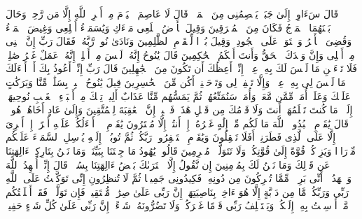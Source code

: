 \stopbuffer
\startbuffer[\q:11:43]
قَالَ سَءَاوِیۤ إِلَىٰ جَبَلࣲ یَعۡصِمُنِی مِنَ ٱلۡمَاۤءِۚ قَالَ لَا عَاصِمَ ٱلۡیَوۡمَ مِنۡ أَمۡرِ ٱللَّهِ إِلَّا مَن رَّحِمَۚ وَحَالَ بَیۡنَهُمَا ٱلۡمَوۡجُ فَكَانَ مِنَ ٱلۡمُغۡرَقِینَ%
\stopbuffer
\startbuffer[\q:11:44]
وَقِیلَ یَٰۤأَرۡضُ ٱبۡلَعِی مَاۤءَكِ وَیَٰسَمَاۤءُ أَقۡلِعِی وَغِیضَ ٱلۡمَاۤءُ وَقُضِیَ ٱلۡأَمۡرُ وَٱسۡتَوَتۡ عَلَى ٱلۡجُودِیِّۖ وَقِیلَ بُعۡدࣰا لِّلۡقَوۡمِ ٱلظَّٰلِمِینَ%
\stopbuffer
\startbuffer[\q:11:45]
وَنَادَىٰ نُوحࣱ رَّبَّهُۥ فَقَالَ رَبِّ إِنَّ ٱبۡنِی مِنۡ أَهۡلِی وَإِنَّ وَعۡدَكَ ٱلۡحَقُّ وَأَنتَ أَحۡكَمُ ٱلۡحَٰكِمِینَ%
\stopbuffer
\startbuffer[\q:11:46]
قَالَ یَٰنُوحُ إِنَّهُۥ لَیۡسَ مِنۡ أَهۡلِكَۖ إِنَّهُۥ عَمَلٌ غَیۡرُ صَٰلِحࣲۖ فَلَا تَسۡءَلۡنِ مَا لَیۡسَ لَكَ بِهِۦ عِلۡمٌۖ إِنِّیۤ أَعِظُكَ أَن تَكُونَ مِنَ ٱلۡجَٰهِلِینَ%
\stopbuffer
\startbuffer[\q:11:47]
قَالَ رَبِّ إِنِّیۤ أَعُوذُ بِكَ أَنۡ أَسۡءَلَكَ مَا لَیۡسَ لِی بِهِۦ عِلۡمࣱۖ وَإِلَّا تَغۡفِرۡ لِی وَتَرۡحَمۡنِیۤ أَكُن مِّنَ ٱلۡخَٰسِرِینَ%
\stopbuffer
\startbuffer[\q:11:48]
قِیلَ یَٰنُوحُ ٱهۡبِطۡ بِسَلَٰمࣲ مِّنَّا وَبَرَكَٰتٍ عَلَیۡكَ وَعَلَىٰۤ أُمَمࣲ مِّمَّن مَّعَكَۚ وَأُمَمࣱ سَنُمَتِّعُهُمۡ ثُمَّ یَمَسُّهُم مِّنَّا عَذَابٌ أَلِیمࣱ%
\stopbuffer
\startbuffer[\q:11:49]
تِلۡكَ مِنۡ أَنۢبَاۤءِ ٱلۡغَیۡبِ نُوحِیهَاۤ إِلَیۡكَۖ مَا كُنتَ تَعۡلَمُهَاۤ أَنتَ وَلَا قَوۡمُكَ مِن قَبۡلِ هَٰذَاۖ فَٱصۡبِرۡۖ إِنَّ ٱلۡعَٰقِبَةَ لِلۡمُتَّقِینَ%
\stopbuffer
\startbuffer[\q:11:50]
وَإِلَىٰ عَادٍ أَخَاهُمۡ هُودࣰاۚ قَالَ یَٰقَوۡمِ ٱعۡبُدُوا۟ ٱللَّهَ مَا لَكُم مِّنۡ إِلَٰهٍ غَیۡرُهُۥۤۖ إِنۡ أَنتُمۡ إِلَّا مُفۡتَرُونَ%
\stopbuffer
\startbuffer[\q:11:51]
یَٰقَوۡمِ لَاۤ أَسۡءَلُكُمۡ عَلَیۡهِ أَجۡرًاۖ إِنۡ أَجۡرِیَ إِلَّا عَلَى ٱلَّذِی فَطَرَنِیۤۚ أَفَلَا تَعۡقِلُونَ%
\stopbuffer
\startbuffer[\q:11:52]
وَیَٰقَوۡمِ ٱسۡتَغۡفِرُوا۟ رَبَّكُمۡ ثُمَّ تُوبُوۤا۟ إِلَیۡهِ یُرۡسِلِ ٱلسَّمَاۤءَ عَلَیۡكُم مِّدۡرَارࣰا وَیَزِدۡكُمۡ قُوَّةً إِلَىٰ قُوَّتِكُمۡ وَلَا تَتَوَلَّوۡا۟ مُجۡرِمِینَ%
\stopbuffer
\startbuffer[\q:11:53]
قَالُوا۟ یَٰهُودُ مَا جِئۡتَنَا بِبَیِّنَةࣲ وَمَا نَحۡنُ بِتَارِكِیۤ ءَالِهَتِنَا عَن قَوۡلِكَ وَمَا نَحۡنُ لَكَ بِمُؤۡمِنِینَ%
\stopbuffer
\startbuffer[\q:11:54]
إِن نَّقُولُ إِلَّا ٱعۡتَرَىٰكَ بَعۡضُ ءَالِهَتِنَا بِسُوۤءࣲۗ قَالَ إِنِّیۤ أُشۡهِدُ ٱللَّهَ وَٱشۡهَدُوۤا۟ أَنِّی بَرِیۤءࣱ مِّمَّا تُشۡرِكُونَ%
\stopbuffer
\startbuffer[\q:11:55]
مِن دُونِهِۦۖ فَكِیدُونِی جَمِیعࣰا ثُمَّ لَا تُنظِرُونِ%
\stopbuffer
\startbuffer[\q:11:56]
إِنِّی تَوَكَّلۡتُ عَلَى ٱللَّهِ رَبِّی وَرَبِّكُمۚ مَّا مِن دَاۤبَّةٍ إِلَّا هُوَ ءَاخِذُۢ بِنَاصِیَتِهَاۤۚ إِنَّ رَبِّی عَلَىٰ صِرَٰطࣲ مُّسۡتَقِیمࣲ%
\stopbuffer
\startbuffer[\q:11:57]
فَإِن تَوَلَّوۡا۟ فَقَدۡ أَبۡلَغۡتُكُم مَّاۤ أُرۡسِلۡتُ بِهِۦۤ إِلَیۡكُمۡۚ وَیَسۡتَخۡلِفُ رَبِّی قَوۡمًا غَیۡرَكُمۡ وَلَا تَضُرُّونَهُۥ شَیۡءًاۚ إِنَّ رَبِّی عَلَىٰ كُلِّ شَیۡءٍ حَفِیظࣱ%

